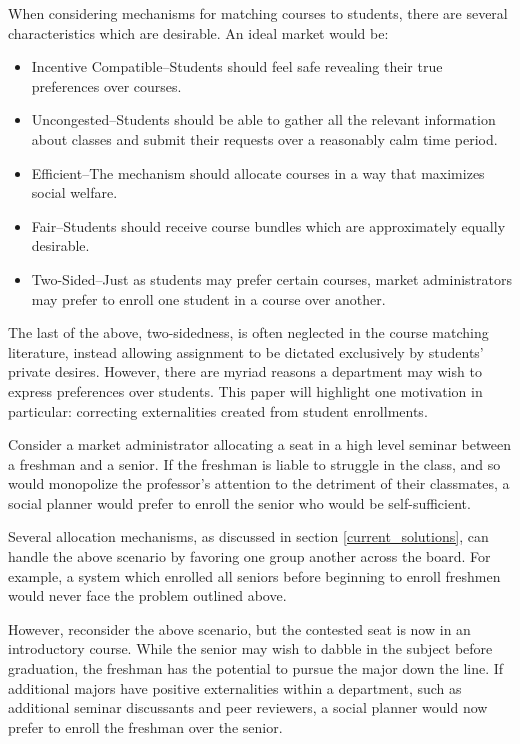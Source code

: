 \documentclass{article}
\begin{document}
When considering mechanisms for matching courses to students, there are several characteristics which are desirable. An ideal market would be:
\begin{itemize}
    \item Incentive Compatible--Students should feel safe revealing their true preferences over courses.
    
    \item Uncongested--Students should be able to gather all the relevant information about classes and submit their requests over a reasonably calm time period.
    
    \item Efficient--The mechanism should allocate courses in a way that maximizes social welfare.
    
    \item Fair--Students should receive course bundles which are approximately equally desirable.
    
    \item Two-Sided--Just as students may prefer certain courses, market administrators may prefer to enroll one student in a course over another.  
\end{itemize}

The last of the above, two-sidedness, is often neglected in the course matching literature, instead allowing assignment to be dictated exclusively by students' private desires. However, there are myriad reasons a department may wish to express preferences over students. This paper will highlight one motivation in particular: correcting externalities created from student enrollments. 

Consider a market administrator allocating a seat in a high level seminar between a freshman and a senior. If the freshman is liable to struggle in the class, and so would monopolize the professor's attention to the detriment of their classmates, a social planner would prefer to enroll the senior who would be self-sufficient. 

Several allocation mechanisms, as discussed in section \ref{current_solutions}, can handle the above scenario by favoring one group another across the board. For example, a system which enrolled all seniors before beginning to enroll freshmen would never face the problem outlined above. 

However, reconsider the above scenario, but the contested seat is now in an introductory course. While the senior may wish to dabble in the subject before graduation, the freshman has the potential to pursue the major down the line. If additional majors have positive externalities within a department, such as additional seminar discussants and peer reviewers, a social planner would now prefer to enroll the freshman over the senior. 
\end{document}
